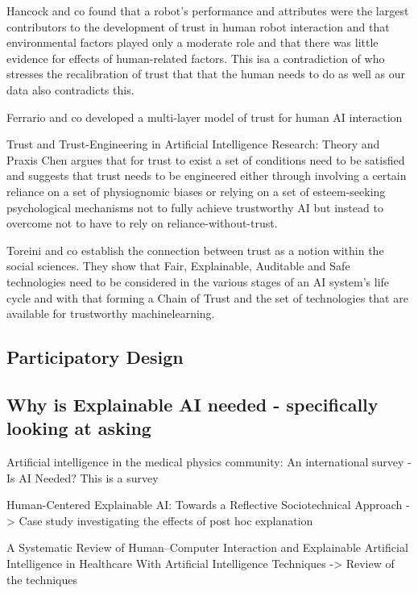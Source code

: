 \documentclass[manuscript,screen,review]{acmart}
\begin{document}
Hancock and co found that a robot's performance and attributes were the largest contributors to the development of trust in human robot interaction and that environmental factors played only a moderate role and that
there was little evidence for effects of human-related factors.\cite{Hancock2011}
This isa a contradiction of \cite{Muir1987} who stresses the recalibration of trust that that the human needs to do as well as our data also contradicts this.

Ferrario and co developed a multi-layer model of trust for human AI interaction \cite{Ferrario2020}

Trust and Trust-Engineering in Artificial Intelligence Research: Theory and Praxis
Chen argues that for trust to exist a set of conditions need to be satisfied and suggests that trust needs to be engineered
either through involving a certain reliance on a set of physiognomic biases or  relying on a set of esteem-seeking psychological mechanisms
not to fully achieve trustworthy AI but instead to overcome not to have to rely on reliance-without-trust.\cite{Chen2021}

Toreini and co establish the connection between trust as a notion within the social sciences.
They show that Fair, Explainable, Auditable and Safe technologies need to be considered in the
various stages of an AI system's life cycle and with that forming a Chain of Trust
and the set of technologies that are available for trustworthy machinelearning.\cite{Toreini2020}

\subsection{Participatory Design}\label{subsec:participatory_design}

\subsection{Why is Explainable AI needed - specifically looking at asking}

Artificial intelligence in the medical physics community: An international survey - Is AI Needed? This is a survey

Human-Centered Explainable AI: Towards a Reflective Sociotechnical Approach -> Case study investigating the effects of post hoc explanation

A Systematic Review of Human–Computer Interaction and Explainable Artificial Intelligence in Healthcare With Artificial Intelligence Techniques -> Review of the techniques
\end{document}
